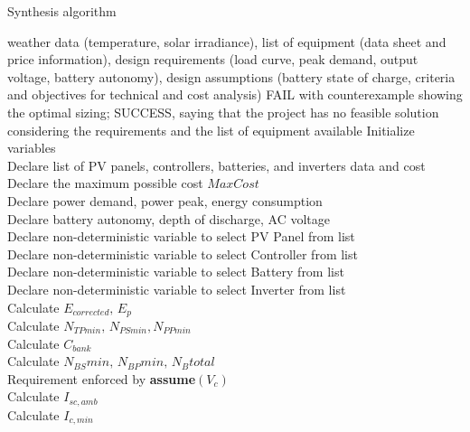  \begin{algorithm}
 \caption{Synthesis algorithm}
 \begin{algorithmic}[1]
 \renewcommand{\algorithmicrequire}{\textbf{Input:}}
 \renewcommand{\algorithmicensure}{\textbf{Output:}}
  \REQUIRE weather data (temperature, solar irradiance), list of equipment (data sheet and price information), design requirements (load curve, peak demand, output voltage, battery autonomy), design assumptions (battery state of charge, criteria and objectives for technical and cost analysis)
 \ENSURE FAIL with counterexample showing the optimal sizing; SUCCESS, saying that the project has no feasible solution considering the requirements and the list of equipment available
  \STATE Initialize variables \\
  \STATE Declare list of PV panels, controllers, batteries, and inverters data and cost \\
  \STATE Declare the maximum possible cost $MaxCost$  \\
  \STATE Declare power demand, power peak, energy consumption \\
  \STATE Declare battery autonomy, depth of discharge, AC voltage \\
 	\STATE Declare non-deterministic variable to select PV Panel from list \\
 	\STATE Declare non-deterministic variable to select Controller from list \\
 	\STATE Declare non-deterministic variable to select Battery from list \\
 	\STATE Declare non-deterministic variable to select Inverter from list \\ 	
 	\STATE Calculate $E_{corrected}, \, E_{p} $ \\
	\STATE Calculate $N_{TPmin}, \, N_{PSmin}, N_{PPmin} $ \\
 	\STATE Calculate $C_{bank}$ \\
	\STATE Calculate $N_{BS}min, \, N_{BP}min, \, N_{B}total$ \\
	\STATE Requirement enforced by \textbf{assume}$(V_{c})$ \\
 	\STATE Calculate $I_{sc,amb}$ \\
 	\STATE Calculate $I_{c,min}$ \\

\end{algorithmic}
\end{algorithm}
